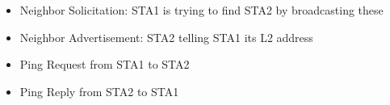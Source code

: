 \begin{itemize}

\item Neighbor Solicitation:  STA1 is trying to find STA2 by broadcasting these
\item Neighbor Advertisement: STA2 telling STA1 its L2 address
\item Ping Request from STA1 to STA2
\item Ping Reply from STA2 to STA1
\end{itemize}
